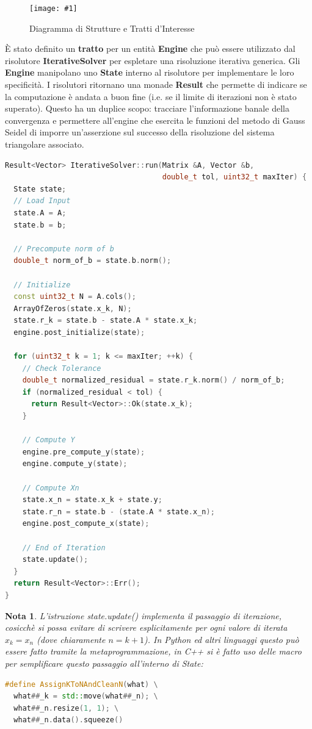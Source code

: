 \documentclass[a4paper,11pt,oneside, table]{article}
\newtheorem{nota}{Nota}
\newcommand{\putimage}[4] {
	\begin{figure}[H]
	    \centering
	    \texttt{[image: \#1]}
	    \caption{#2}\label{#3}
	\end{figure}
}
\begin{document}
\putimage{images/diagram.png}{Diagramma di Strutture e Tratti d'Interesse}{png:diagram_of_structures}{0.9}

\`E stato definito un \textbf{tratto} per un entit\`a \textbf{Engine} che pu\`o essere utilizzato dal risolutore \textbf{IterativeSolver} per espletare una risoluzione iterativa generica. Gli \textbf{Engine} manipolano uno \textbf{State} interno al risolutore per implementare le loro specificit\`a. I risolutori ritornano una monade \textbf{Result} che permette di indicare se la computazione \`e andata a buon fine (i.e. se il limite di iterazioni non \`e stato superato). Questo ha un duplice scopo: tracciare l'informazione banale della convergenza e permettere all'engine che esercita le funzioni del metodo di Gauss Seidel di imporre un'asserzione sul successo della risoluzione del sistema triangolare associato.

\begin{lstlisting}[language=C++]
Result<Vector> IterativeSolver::run(Matrix &A, Vector &b,
                                    double_t tol, uint32_t maxIter) {
  State state;
  // Load Input
  state.A = A;
  state.b = b;

  // Precompute norm of b
  double_t norm_of_b = state.b.norm();

  // Initialize
  const uint32_t N = A.cols();
  ArrayOfZeros(state.x_k, N);
  state.r_k = state.b - state.A * state.x_k;
  engine.post_initialize(state);

  for (uint32_t k = 1; k <= maxIter; ++k) {
    // Check Tolerance
    double_t normalized_residual = state.r_k.norm() / norm_of_b;
    if (normalized_residual < tol) {
      return Result<Vector>::Ok(state.x_k);
    }

    // Compute Y
    engine.pre_compute_y(state);
    engine.compute_y(state);

    // Compute Xn
    state.x_n = state.x_k + state.y;
    state.r_n = state.b - (state.A * state.x_n);
    engine.post_compute_x(state);

    // End of Iteration
    state.update();
  } 
  return Result<Vector>::Err();
}
\end{lstlisting}

\begin{nota}
L'istruzione \textit{state.update()} implementa il passaggio di iterazione, cosicch\`e si possa evitare di scrivere esplicitamente per ogni valore di iterata $x_k = x_n$ (dove chiaramente $n = k+1$). In Python ed altri linguaggi questo pu\`o essere fatto tramite la metaprogrammazione, in C++ si \`e fatto uso delle macro per semplificare questo passaggio all'interno di \textit{State}:


\begin{lstlisting}[language=C++]
#define AssignKToNAndCleanN(what) \
  what##_k = std::move(what##_n); \
  what##_n.resize(1, 1); \
  what##_n.data().squeeze()
\end{lstlisting}
\end{nota}
\end{document}
